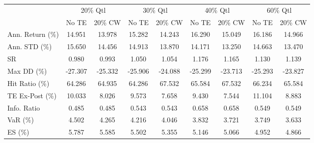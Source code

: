 \begin{tabular}{lcccccccc}
\toprule
{} & \multicolumn{2}{c}{20\% Qtl} & \multicolumn{2}{c}{30\% Qtl} & \multicolumn{2}{c}{40\% Qtl} & \multicolumn{2}{c}{60\% Qtl} \\
{} &   No TE &  20\% CW &   No TE &  20\% CW &   No TE &  20\% CW &   No TE &  20\% CW \\
\midrule
Ann. Return (\%) &  14.951 &  13.978 &  15.282 &  14.243 &  16.290 &  15.049 &  16.186 &  14.966 \\
Ann. STD (\%)    &  15.650 &  14.456 &  14.913 &  13.870 &  14.171 &  13.250 &  14.663 &  13.470 \\
SR              &   0.980 &   0.993 &   1.050 &   1.054 &   1.176 &   1.165 &   1.130 &   1.139 \\
Max DD (\%)      & -27.307 & -25.332 & -25.906 & -24.088 & -25.299 & -23.713 & -25.293 & -23.827 \\
Hit Ratio (\%)   &  64.286 &  64.935 &  64.286 &  67.532 &  65.584 &  67.532 &  66.234 &  65.584 \\
TE Ex-Post (\%)  &  10.033 &   8.026 &   9.573 &   7.658 &   9.430 &   7.544 &  11.104 &   8.883 \\
Info. Ratio     &   0.485 &   0.485 &   0.543 &   0.543 &   0.658 &   0.658 &   0.549 &   0.549 \\
VaR (\%)         &   4.502 &   4.265 &   4.216 &   4.046 &   3.832 &   3.721 &   3.749 &   3.633 \\
ES (\%)          &   5.787 &   5.585 &   5.502 &   5.355 &   5.146 &   5.066 &   4.952 &   4.866 \\
\bottomrule
\end{tabular}
